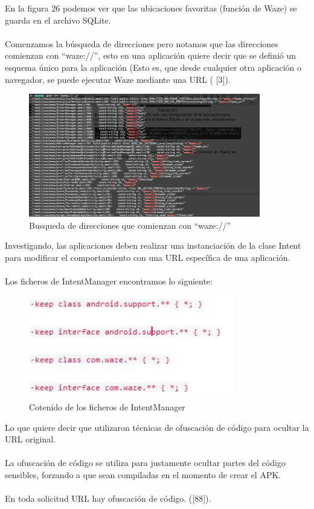 En la figura 26 podemos ver que las ubicaciones favoritas (función de Waze) se guarda en el archivo SQLite.
\\\\
Comenzamos la búsqueda de direcciones pero notamos que las direcciones comienzan con “waze://”, esto en una aplicación quiere decir que se definió un esquema único para la aplicación (Esto es, que desde cualquier otra aplicación o navegador, se puede ejecutar Waze mediante una URL ( [3]).

    \begin{figure}[H]
  \begin{center}
    \includegraphics[width=0.9\textwidth]{imagenes/fig30.png}
    \caption{Busqueda de direcciones que comienzan con “waze://”}
  \end{center}
\end{figure}

Investigando, las aplicaciones deben realizar una instanciación de la clase Intent para modificar el comportamiento con una URL específica de una aplicación.
\\\\
Los ficheros de IntentManager encontramos lo siguiente:

    \begin{figure}[H]
  \begin{center}
    \includegraphics[width=0.8\textwidth]{imagenes/contFig30.JPG}
    \caption{Cotenido de los ficheros de IntentManager}
  \end{center}
\end{figure}


Lo que quiere decir que utilizaron técnicas de ofuscación de código para ocultar la URL original.
\\\\
La ofuscación de código se utiliza para justamente ocultar partes del código sensibles, forzando a que sean compiladas en el momento de crear el APK.
\\\\
En toda solicitud URL hay ofuscación de código. ([88]).